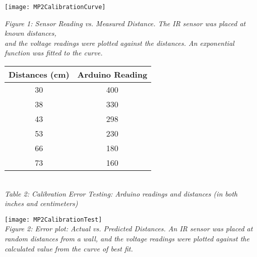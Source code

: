\documentclass{article}
\begin{document}
    
    \texttt{[image: MP2CalibrationCurve]}
    \begin{center}
        \textit{Figure 1: Sensor Reading vs. Measured Distance. The IR sensor was placed at known distances, \\and the voltage readings were plotted against the distances. An exponential function was fitted to the curve.}
    \end{center}


    
    \begin{center}
    \begin{tabular}{ |c|c| } 
        \hline
        Distances (cm) & Arduino Reading \\
        \hline
        30 & 400 \\
        38 & 330 \\
        43 & 298 \\
        53 & 230 \\
        66 & 180 \\
        73 & 160 \\
        \hline
    \end{tabular}
    \vspace{3 mm}
    \\
    \textit{Table 2: Calibration Error Testing: Arduino readings and distances (in both inches and centimeters)}
    \end{center}

    
    \begin{center}
        \texttt{[image: MP2CalibrationTest]} \\
        \textit{Figure 2: Error plot: Actual vs. Predicted Distances. An IR sensor was placed at random distances from a wall, and the voltage readings were plotted against the calculated value from the curve of best fit.}
    \end{center}
\end{document}
